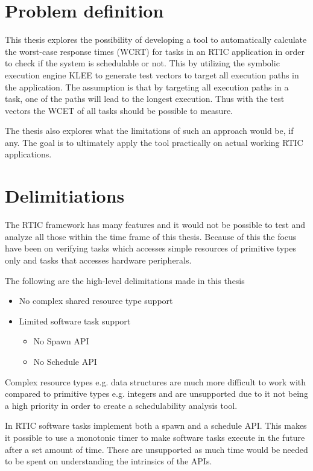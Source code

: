 \section{Problem definition}
This thesis explores the possibility of developing a tool to automatically
calculate the worst-case response times (WCRT) for tasks in an RTIC application
in order to check if the system is schedulable or not. This by utilizing the
symbolic execution engine KLEE to generate test vectors to target all execution
paths in the application. The assumption is that by targeting all execution
paths in a task, one of the paths will lead to the longest execution. Thus
with the test vectors the WCET of all tasks should be possible to measure.

The thesis also explores what the limitations of such an approach would be, if
any. The goal is to ultimately apply the tool practically on actual working
RTIC applications.

\section{Delimitiations}
The RTIC framework has many features and it would not be possible to test and
analyze all those within the time frame of this thesis. Because of this the
focus have been on verifying tasks which accesses simple resources of primitive
types only and tasks that accesses hardware peripherals. 

The following are the high-level delimitations made in this thesis
\begin{itemize}
    \item No complex shared resource type support
    \item Limited software task support
    \begin{itemize}
        \item No Spawn API
        \item No Schedule API
    \end{itemize}
\end{itemize}
Complex resource types e.g. data structures are much more difficult to work
with compared to primitive types e.g. integers and are unsupported due to it
not being a high priority in order to create a schedulability analysis tool.

In RTIC software tasks implement both a spawn and a schedule API. This makes it
possible to use a monotonic timer to make software tasks execute in the future
after a set amount of time. These are unsupported as much time would be needed
to be spent on understanding the intrinsics of the APIs.


